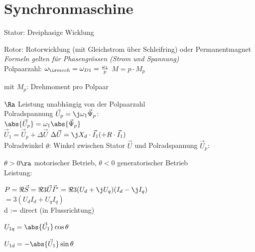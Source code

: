 \documentclass[german]{latex4ei_fs}
\begin{document}
\section{Synchronmaschine}

\begin{sectionbox}
Stator: Dreiphasige Wicklung

Rotor: Rotorwicklung (mit Gleichstrom über Schleifring) oder Permanentmagnet\\

\emph{Formeln gelten für Phasengrössen (Strom und Spannung)} \\

Polpaarzahl: $\omega_{\ir mech} = \omega_{D1} = \frac{\omega_1}{p}$ \quad $M = p \cdot M_{p}$ 

mit $M_p$: Drehmoment pro Polpaar 

$\Ra$ Leistung unabhängig von der Polpaarzahl\\

Polradspannung $\vec U_p = \j \omega_1 \vec \Psi_p$: \\

 $\abs{\vec U_p} = \omega_1 \abs{\vec \Psi_p}$\\


 $\vec U_1 = \vec U_p + \Delta \vec U$
 $\Delta \vec U = \j X_d \cdot \vec I_1 (+ R \cdot \vec I_1)$ \\

Polradwinkel $\theta$: Winkel zwischen Stator $\vec U$ und Polradspannung $\vec U_p$:

$\theta > 0 \ra$ motorischer Betrieb, $\theta < 0 $ generatorischer Betrieb \\


Leistung:

 $P = \Re{\vec S}  = \Re{ 3 \vec U \vec I^* } = \Re{3( U_d + \j U_q ) (I_d - \j I_q)}$ \\ $= 3 (U_d I_d + U_q I_q)$ \\

 d := direct (in Flussrichtung)

 $U_{1q} = \abs{\vec U_1} \cos \theta$

 $U_{1d} = - \abs{\vec U_1} \sin \theta$

 \end{sectionbox}
\end{document}

